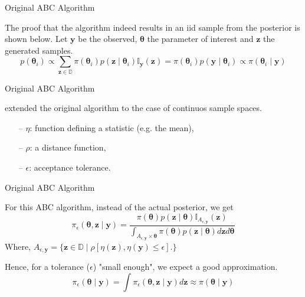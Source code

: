 \documentclass[10pt]{beamer}
\begin{document}
\begin{frame}[fragile]{Original ABC Algorithm}

  The proof that the algorithm indeed results in an iid sample
  from the posterior is shown below. Let $\bm y$ be the observed,
  $\bm \theta$ the parameter of interest and $\bm z$ the generated
  samples.
  $$
  p(\bm \theta_i) \propto \sum_{\bm z \in \mathbb{D}}
  \pi(\bm \theta_i) p(\bm z \mid \bm \theta_i) \mathbb I_{\bm y}(\bm z)
  = \pi(\bm \theta_i) p(\bm y \mid \bm \theta_i) \propto
  \pi(\bm \theta_i \mid \bm y)
  $$

\end{frame}

\begin{frame}[fragile]{Original ABC Algorithm}

  \citet{Pritchard1999} extended the original algorithm to the case
  of continuos sample spaces.

  \vspace{0.3cm}

\begin{algorithm}[H]
\SetAlgoLined
{}
 \caption{ABC method for discrete and continuous distributions}
\end{algorithm}
\begin{itemize}
  \item[--] $\eta$: function defining a statistic (e.g. the mean),
  \item[--] $\rho$: a distance function,
  \item[--] $\epsilon$: acceptance tolerance.
\end{itemize}

\end{frame}

\begin{frame}[fragile]{Original ABC Algorithm}

  For this ABC algorithm, instead of the actual posterior,
  we get
  $$
  \pi_\epsilon(\bm \theta, \bm z \mid \bm y) = 
  \frac{\pi(\bm \theta) p(\bm z \mid \bm \theta)
  \mathbb I_{A_{\epsilon,\bm y}}(\bm z)}
  {\int_{A_{\epsilon,\bm y}\times \bm\theta}\pi(\bm \theta)
  p(\bm z \mid \bm \theta)d\bm z d \bm \theta}
  $$
  Where, $A_{\epsilon,\bm y} = \{
  \bm z \in \mathbb D \mid \rho[\eta(\bm z), \eta(\bm y) \leq \epsilon].
  \}$

  Hence, for a tolerance ($\epsilon$) "small enough", we expect a good
  approximation.
  $$\pi_\epsilon(\bm \theta \mid \bm y) = 
  \int \pi_\epsilon(\bm \theta, \bm z \mid \bm y) d \bm z \approx
  \pi(\bm \theta \mid \bm y)$$

\end{frame}
\end{document}
